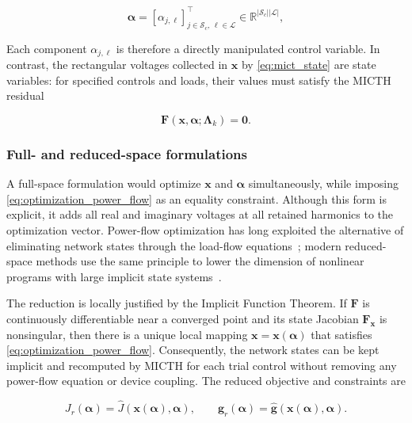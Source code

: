 \documentclass[journal]{IEEEtran}
\begin{document}
\begin{equation}
    \boldsymbol{\alpha} =
    \left[\alpha_{j,\ell}\right]_{j \in \mathcal{S}_c,\,\ell \in \mathcal{L}}^{\top}
    \in \mathbb{R}^{|\mathcal{S}_c||\mathcal{L}|},
    \label{eq:alphavector}
\end{equation}

Each component $\alpha_{j,\ell}$ is therefore a directly manipulated control
variable. In contrast, the rectangular voltages collected in $\mathbf{x}$ by
\eqref{eq:mict_state} are state variables: for specified controls and
loads, their values must satisfy the MICTH residual

\begin{equation}
    \mathbf{F}(\mathbf{x},\boldsymbol{\alpha};
    \boldsymbol{\Lambda}_k)=\mathbf{0}.
    \label{eq:optimization_power_flow}
\end{equation}

\subsubsection{Full- and reduced-space formulations}

A full-space formulation would optimize $\mathbf{x}$ and
$\boldsymbol{\alpha}$ simultaneously, while imposing
\eqref{eq:optimization_power_flow} as an equality constraint. Although this
form is explicit, it adds all real and imaginary voltages at all retained
harmonics to the optimization vector. Power-flow optimization has long
exploited the alternative of eliminating network states through the load-flow
equations~\cite{DommelTinney1968}; modern reduced-space methods use the same
principle to lower the dimension of nonlinear programs with large implicit
state systems~\cite{Pacaud2022ReducedSpace}.

The reduction is locally justified by the Implicit Function Theorem. If
$\mathbf{F}$ is continuously differentiable near a converged point and its
state Jacobian $\mathbf{F}_{\mathbf{x}}$ is nonsingular, then there is a unique
local mapping $\mathbf{x}=\mathbf{x}(\boldsymbol{\alpha})$ that satisfies
\eqref{eq:optimization_power_flow}. Consequently, the network states can be
kept implicit and recomputed by MICTH for each trial control without removing
any power-flow equation or device coupling. The reduced objective and
constraints are

\begin{equation}
    J_r(\boldsymbol{\alpha})=
    \widehat{J}(\mathbf{x}(\boldsymbol{\alpha}),\boldsymbol{\alpha}),
    \qquad
    \mathbf{g}_r(\boldsymbol{\alpha})=
    \widehat{\mathbf{g}}(\mathbf{x}(\boldsymbol{\alpha}),\boldsymbol{\alpha}).
    \label{eq:reduced_functions}
\end{equation}
\end{document}

